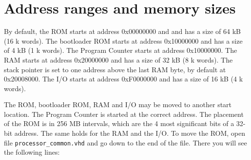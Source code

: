 \documentclass[12pt]{article}
\begin{document}
%
%

\section{Address ranges and memory sizes}
By default, the ROM starts at address 0x00000000 and and has a size of 64 kB (16 k words). The bootloader ROM starts at address 0x10000000 and has a size of 4 kB (1 k words). The Program Counter starts at address 0x10000000. The RAM starts at address 0x20000000 and has a size of 32 kB (8 k words). The stack pointer is set to one address above the last RAM byte, by default at 0x20008000. The I/O starts at address 0xF0000000 and has a size of 16 kB (4 k words).

The ROM, bootloader ROM, RAM and I/O may be moved to another start location. The Program Counter is started at the correct address. The placement of the ROM is in 256 MB intervals, which are the 4 most significant bits of a 32-bit address. The same holds for the RAM and the I/O. To move the ROM, open file \lstinline|processor_common.vhd| and go down to the end of the file. There you will see the following lines:
\end{document}
